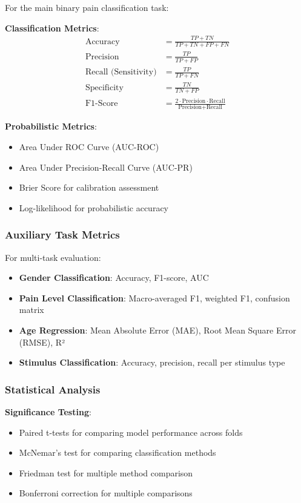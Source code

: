 \documentclass[10pt,journal,compsoc]{IEEEtran}
\begin{document}
For the main binary pain classification task:

\textbf{Classification Metrics}:
\begin{align}
\text{Accuracy} &= \frac{TP + TN}{TP + TN + FP + FN} \\
\text{Precision} &= \frac{TP}{TP + FP} \\
\text{Recall (Sensitivity)} &= \frac{TP}{TP + FN} \\
\text{Specificity} &= \frac{TN}{TN + FP} \\
\text{F1-Score} &= \frac{2 \cdot \text{Precision} \cdot \text{Recall}}{\text{Precision} + \text{Recall}}
\end{align}

\textbf{Probabilistic Metrics}:
\begin{itemize}
\item Area Under ROC Curve (AUC-ROC)
\item Area Under Precision-Recall Curve (AUC-PR)
\item Brier Score for calibration assessment
\item Log-likelihood for probabilistic accuracy
\end{itemize}

\subsubsection{Auxiliary Task Metrics}

For multi-task evaluation:
\begin{itemize}
\item \textbf{Gender Classification}: Accuracy, F1-score, AUC
\item \textbf{Pain Level Classification}: Macro-averaged F1, weighted F1, confusion matrix
\item \textbf{Age Regression}: Mean Absolute Error (MAE), Root Mean Square Error (RMSE), R²
\item \textbf{Stimulus Classification}: Accuracy, precision, recall per stimulus type
\end{itemize}

\subsubsection{Statistical Analysis}

\textbf{Significance Testing}:
\begin{itemize}
\item Paired t-tests for comparing model performance across folds
\item McNemar's test for comparing classification methods
\item Friedman test for multiple method comparison
\item Bonferroni correction for multiple comparisons
\end{itemize}
\end{document}
